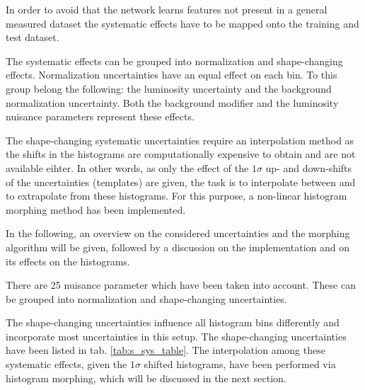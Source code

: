In order to avoid that the network learns features not present in a general measured dataset the systematic effects have to be mapped onto the training and test dataset.


The systematic effects can be grouped into normalization and shape-changing effects.
Normalization uncertainties have an equal effect on each bin. To this group belong the following: the luminosity uncertainty and the background normalization uncertainty. Both the background modifier and the luminosity nuisance parameters represent these effects.

The shape-changing systematic uncertainties require an interpolation method as the shifts in the histograms are computationally expensive to obtain and are not available eihter. In other words, as only the effect of the $1\sigma$ up- and down-shifts of the uncertainties (templates) are given, the task is to interpolate between and to extrapolate from these histograms. For this purpose, a non-linear histogram morphing method has been implemented.

In the following, an overview on the considered uncertainties and the morphing algorithm will be given, followed by a discussion on the implementation and on its effects on the histograms.


There are 25 nuisance parameter which have been taken into account. These can be grouped into normalization and shape-changing uncertainties.

The shape-changing uncertainties influence all histogram bins differently and incorporate most uncertainties in this setup. The shape-changing uncertainties have been listed in tab. \ref{tab:s_sys_table}. The interpolation among these systematic effects, given the $1\sigma$ shifted histograms, have been performed via histogram morphing, which will be discussed in the next section.

